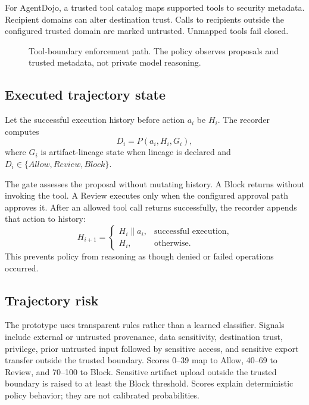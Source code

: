 \documentclass[letterpaper,twocolumn,10pt]{article}
\begin{document}
For AgentDojo, a trusted tool catalog maps supported tools to security metadata. Recipient domains can alter destination trust. Calls to recipients outside the configured trusted domain are marked untrusted. Unmapped tools fail closed.

\begin{figure}[t]
\centering
{}
\caption{Tool-boundary enforcement path. The policy observes proposals and trusted metadata, not private model reasoning.}
\label{fig:architecture}
\end{figure}

\subsection{Executed trajectory state}
Let the successful execution history before action $a_i$ be $H_i$. The recorder computes
\[
D_i=P(a_i,H_i,G_i),
\]
where $G_i$ is artifact-lineage state when lineage is declared and $D_i\in\{Allow,Review,Block\}$.

The gate assesses the proposal without mutating history. A Block returns without invoking the tool. A Review executes only when the configured approval path approves it. After an allowed tool call returns successfully, the recorder appends that action to history:
\[
H_{i+1}=\begin{cases}
H_i\mathbin{\|}a_i,&\text{successful execution},\\
H_i,&\text{otherwise.}
\end{cases}
\]
This prevents policy from reasoning as though denied or failed operations occurred.

\subsection{Trajectory risk}
The prototype uses transparent rules rather than a learned classifier. Signals include external or untrusted provenance, data sensitivity, destination trust, privilege, prior untrusted input followed by sensitive access, and sensitive export transfer outside the trusted boundary. Scores 0--39 map to Allow, 40--69 to Review, and 70--100 to Block. Sensitive artifact upload outside the trusted boundary is raised to at least the Block threshold. Scores explain deterministic policy behavior; they are not calibrated probabilities.
\end{document}
